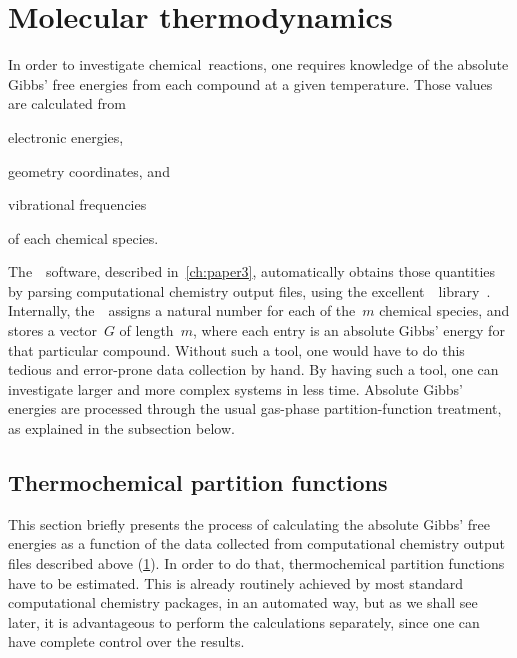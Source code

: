 \section{Molecular thermodynamics}%
\label{sec:mol-thermo}

In order to investigate chemical~reactions,
one requires knowledge of the absolute Gibbs' free energies from each compound at a given temperature.
Those values are calculated from
\begin{enumerate*}
	\item electronic energies,
	\item geometry coordinates,
	      and
	\item vibrational frequencies
\end{enumerate*}
of each chemical species.

The~\overreact{}~software,
described in~\cref{ch:paper3},
automatically obtains those quantities by parsing computational chemistry output files,
using the excellent~\cclib{}~library~\cite{O_boyle_2008}.
Internally,
the~\overreact{}~assigns a natural number for each of the~$m$ chemical species,
and stores a vector~$G$ of length~$m$,
where each entry is an absolute Gibbs' energy for that particular compound.
Without such a tool,
one would have to do this tedious and error-prone data collection by hand.
By having such a tool,
one can investigate larger and more complex systems in less time.
Absolute Gibbs' energies are processed through the usual gas-phase partition-function treatment,
as explained in the subsection below.

\subsection{Thermochemical partition functions}%
\label{sec:rrho}

This section briefly presents the process of calculating
the absolute Gibbs' free energies as a function of the data collected
from computational chemistry output files described above (\cref{sec:mol-thermo}).
In order to do that,
thermochemical partition
functions have to be estimated.
This is already routinely achieved by most standard computational chemistry packages,
in an automated way,
but as we shall see later,
it is advantageous to perform
the calculations separately,
since one can have complete control over the results.

